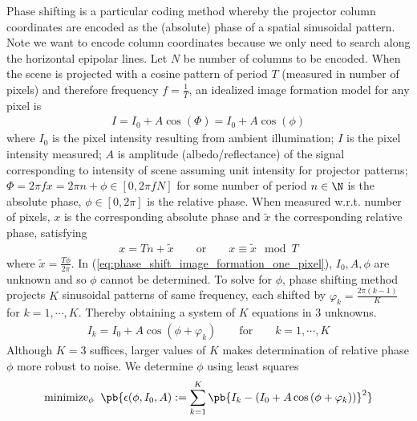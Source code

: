\documentclass[../writeup.tex]{subfiles}
\begin{document}
Phase shifting is a particular coding method whereby the projector column coordinates are encoded as the (absolute) phase of a spatial sinusoidal pattern. Note we want to encode column coordinates because we only need to search along the horizontal epipolar lines. Let $N$ be number of columns to be encoded. When the scene is projected with a cosine pattern of period $T$ (measured in number of pixels) and therefore frequency $f=\frac{1}{T}$, an idealized image formation model for any pixel is
\begin{align}
    I 
        = I_0 + A\cos\left( \Phi \right)
        = I_0 + A\cos\left( \phi \right)
    \label{eq:phase_shift_image_formation_one_pixel}
\end{align}
where $I_0$ is the pixel intensity resulting from ambient illumination; $I$ is the pixel intensity measured; $A$ is amplitude (albedo/reflectance) of the signal corresponding to intensity of scene assuming unit intensity for projector patterns; $\Phi = 2\pi f x = 2\pi n + \phi \in [0, 2\pi f N]$ for some number of period $n\in\N$ is the absolute phase, $\phi \in [0,2\pi]$ is the relative phase. When measured w.r.t. number of pixels, $x$ is the corresponding absolute phase and $\tilde{x}$ the corresponding relative phase, satisfying
\begin{align}
    x = Tn + \tilde{x}
    \qquad\text{or}\qquad
    x \equiv \tilde{x} \mod{T}
\end{align}
where $\tilde{x} = \frac{T \phi}{2\pi}$. In (\ref{eq:phase_shift_image_formation_one_pixel}), $I_0,A,\phi$ are unknown and so $\phi$ cannot be determined. To solve for $\phi$, phase shifting method projects $K$ sinusoidal patterns of same frequency, each shifted by $\varphi_k = \frac{2\pi (k-1)}{K}$ for $k=1,\cdots,K$. Thereby obtaining a system of $K$ equations in 3 unknowns. 
\begin{align}
    I_k = I_0 + A\cos\left(\phi + \varphi_k \right)
    \qquad\text{for}\qquad
    k = 1,\cdots,K
    \label{eq:phase_shift_image_formation_one_pixel_shifted}
\end{align}
Although $K=3$ suffices, larger values of $K$ makes determination of relative phase $\phi$ more robust to noise. We determine $\phi$ using least squares
\begin{align}
    \text{minimize}_{\phi}\;\;\pb{
        \epsilon(\phi,I_0,A) := 
            \sum_{k=1}^{K} \pb{
                I_k - \left(
                    I_0 + A\cos\left( \phi + \varphi_k \right)
                \right)
            }^2
    }
    \label{eq:phase_shifting_least_squares}
\end{align}
\end{document}
